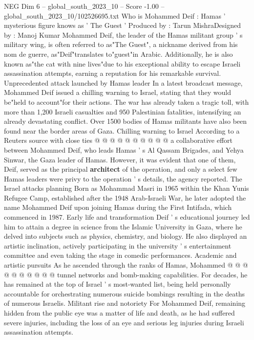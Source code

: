 \begin{textsample}{NEG Dim 6 – global\_south\_2023\_10 – Score -1.00 – global\_south\_2023\_10/102526695.txt}  \label{ex:f6_neg_149}
Who is Mohammed Deif : Hamas ' mysterious figure knows as ' The Guest ' Produced by : Tarun MishraDesigned by : Manoj Kumar Mohammed Deif, the leader of the Hamas militant group ' s military wing, is often referred to as"The Guest", a nickname derived from his nom de guerre, as"Deif"translates to"guest"in Arabic.
Additionally, he is also known as"the cat with nine lives"due to his exceptional ability to escape Israeli assassination attempts, earning a reputation for his remarkable survival.
Unprecedented attack launched by Hamas leader In a latest broadcast message, Mohammed Deif issued a chilling warning to Israel, stating that they would be"held to account"for their actions.
The war has already taken a tragic toll, with more than 1,200 Israeli casualties and 950 Palestinian fatalities, intensifying an already devastating conflict.
Over 1500 bodies of Hamas militants have also been found near the border areas of Gaza.
Chilling warning to Israel According to a Reuters source with close ties @ @ @ @ @ @ @ @ @ @ a collaborative effort between Mohammed Deif, who leads Hamas ' s Al Qassam Brigades, and Yehya Sinwar, the Gaza leader of Hamas.
However, it was evident that one of them, Deif, served as the principal \textbf{architect} of the operation, and only a select few Hamas leaders were privy to the operation ' s details, the agency reported.
The Israel attacks planning Born as Mohammad Masri in 1965 within the Khan Yunis Refugee Camp, established after the 1948 Arab-Israeli War, he later adopted the name Mohammed Deif upon joining Hamas during the First Intifada, which commenced in 1987.
Early life and transformation Deif ' s educational journey led him to attain a degree in science from the Islamic University in Gaza, where he delved into subjects such as physics, chemistry, and biology.
He also displayed an artistic inclination, actively participating in the university ' s entertainment committee and even taking the stage in comedic performances.
Academic and artistic pursuits As he ascended through the ranks of Hamas, Mohammed @ @ @ @ @ @ @ @ @ @ tunnel networks and bomb-making capabilities.
For decades, he has remained at the top of Israel ' s most-wanted list, being held personally accountable for orchestrating numerous suicide bombings resulting in the deaths of numerous Israelis.
Militant rise and notoriety For Mohammed Deif, remaining hidden from the public eye was a matter of life and death, as he had suffered severe injuries, including the loss of an eye and serious leg injuries during Israeli assassination attempts.

\end{textsample}
